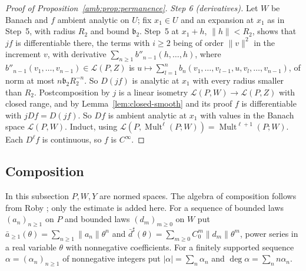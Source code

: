 \documentclass[11pt]{amsart}
\theoremstyle{definition}
\theoremstyle{remark}
\numberwithin{equation}{section}
\newcommand{\cL}{\mathcal L}
\newcommand{\Mult}{\operatorname{Mult}}
\newcommand{\abs}[1]{\lvert #1\rvert}
\newcommand{\norm}[1]{\lVert #1\rVert}
\theoremstyle{plain}
\theoremstyle{definition}
\theoremstyle{plain}
\begin{document}
\begin{proof}[Proof of Proposition~\ref{amb:prop:permanence}]
\emph{Step 6 (derivatives).} Let $W$ be Banach and $f$ ambient analytic on $U$; fix $x_1\in U$ and an expansion at $x_1$ as in Step~5, with radius $R_2$ and bound $\mathfrak b_2$. Step~5 at $x_1+h$, $\norm h<R_2$, shows that $jf$ is differentiable there, the terms with $i\ge2$ being of order $\norm v^2$ in the increment $v$, with derivative $\sum_{n\ge1}b''_{n-1}(h,\dots,h)$, where $b''_{n-1}(v_1,\dots,v_{n-1})\in\cL(P,Z)$ is $u\mapsto\sum_{l=1}^nb_n(v_1,\dots,v_{l-1},u,v_l,\dots,v_{n-1})$, of norm at most $n\mathfrak b_2R_2^{-n}$. So $D(jf)$ is analytic at $x_1$ with every radius smaller than $R_2$. Postcomposition by $j$ is a linear isometry $\cL(P,W)\to\cL(P,Z)$ with closed range, and by Lemma~\ref{lem:closed-smooth} and its proof $f$ is differentiable with $jDf=D(jf)$. So $Df$ is ambient analytic at $x_1$ with values in the Banach space $\cL(P,W)$. Induct, using $\cL(P,\Mult^\ell(P;W))=\Mult^{\ell+1}(P;W)$. Each $D^\ell f$ is continuous, so $f$ is $C^\infty$.
\end{proof}
\subsection{Composition}\label{amb:ssec:proofs-composition}

In this subsection $P,W,Y$ are normed spaces. The algebra of composition follows from Roby \cite[VI \S8, Prop.~VI.6 and its Cor.; Prop.~I.2; II \S1]{Ro}; only the estimate is added here. For a sequence of bounded laws $(a_n)_{n\ge1}$ on $P$ and bounded laws $(d_m)_{m\ge0}$ on $W$ put $\bar a_{\ge1}(\theta)=\sum_{n\ge1}\norm{a_n}\theta^n$ and $\bar d^\sharp(\theta)=\sum_{m\ge0}C_0^m\norm{d_m}\theta^m$, power series in a real variable $\theta$ with nonnegative coefficients. For a finitely supported sequence $\alpha=(\alpha_n)_{n\ge1}$ of nonnegative integers put $\abs\alpha=\sum_n\alpha_n$ and $\deg\alpha=\sum_nn\alpha_n$.
\end{document}
